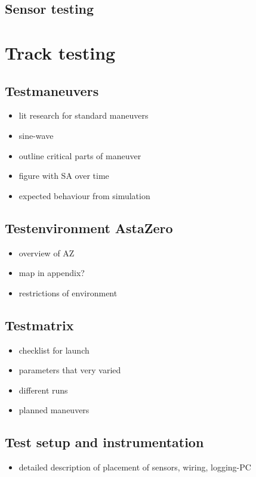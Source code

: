 \documentclass[ExampleMasters.tex]{subfiles}
\begin{document}
\subsection{Sensor testing}


\section{Track testing}
\label{sec:track-testing}

\subsection{Testmaneuvers}

\begin{itemize}
	\item lit research for standard maneuvers
	\item sine-wave
	\item outline critical parts of maneuver
	\item figure with SA over time
	\item expected behaviour from simulation
\end{itemize}

\subsection{Testenvironment AstaZero}

\begin{itemize}
	\item overview of AZ
	\item map in appendix?
	\item restrictions of environment
	
\end{itemize}

\subsection{Testmatrix}

\begin{itemize}
	\item checklist for launch
	\item parameters that very varied
	\item different runs
	\item planned maneuvers
	
\end{itemize}

\subsection{Test setup and instrumentation}

\begin{itemize}
	\item detailed description of placement of sensors, wiring, logging-PC
\end{itemize}
\end{document}
